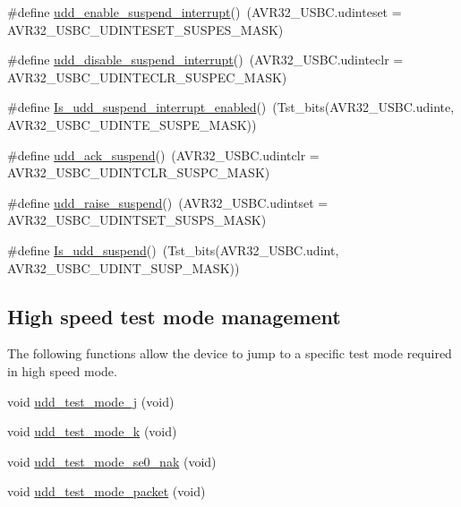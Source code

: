 \begin{DoxyCompactItemize}
\item 
\#define \hyperlink{group__udd__group_ga298cc43d16d7d9609d58adffe696b5db}{udd\-\_\-enable\-\_\-suspend\-\_\-interrupt}()~(\-A\-V\-R32\-\_\-\-U\-S\-B\-C.\-udinteset = \-A\-V\-R32\-\_\-\-U\-S\-B\-C\-\_\-\-U\-D\-I\-N\-T\-E\-S\-E\-T\-\_\-\-S\-U\-S\-P\-E\-S\-\_\-\-M\-A\-S\-K)
\item 
\#define \hyperlink{group__udd__group_ga1470fba0dbc68e890140d806277ee8c1}{udd\-\_\-disable\-\_\-suspend\-\_\-interrupt}()~(\-A\-V\-R32\-\_\-\-U\-S\-B\-C.\-udinteclr = \-A\-V\-R32\-\_\-\-U\-S\-B\-C\-\_\-\-U\-D\-I\-N\-T\-E\-C\-L\-R\-\_\-\-S\-U\-S\-P\-E\-C\-\_\-\-M\-A\-S\-K)
\item 
\#define \hyperlink{group__udd__group_ga2a9c882005f263ea9e181273bf316e27}{\-Is\-\_\-udd\-\_\-suspend\-\_\-interrupt\-\_\-enabled}()~(\-Tst\-\_\-bits(\-A\-V\-R32\-\_\-\-U\-S\-B\-C.\-udinte, \-A\-V\-R32\-\_\-\-U\-S\-B\-C\-\_\-\-U\-D\-I\-N\-T\-E\-\_\-\-S\-U\-S\-P\-E\-\_\-\-M\-A\-S\-K))
\item 
\#define \hyperlink{group__udd__group_ga9a61b0228571cf2c0225c86f3e3a618e}{udd\-\_\-ack\-\_\-suspend}()~(\-A\-V\-R32\-\_\-\-U\-S\-B\-C.\-udintclr = \-A\-V\-R32\-\_\-\-U\-S\-B\-C\-\_\-\-U\-D\-I\-N\-T\-C\-L\-R\-\_\-\-S\-U\-S\-P\-C\-\_\-\-M\-A\-S\-K)
\item 
\#define \hyperlink{group__udd__group_ga997d9f1f31efd62ddcce775a4f40a0bd}{udd\-\_\-raise\-\_\-suspend}()~(\-A\-V\-R32\-\_\-\-U\-S\-B\-C.\-udintset = \-A\-V\-R32\-\_\-\-U\-S\-B\-C\-\_\-\-U\-D\-I\-N\-T\-S\-E\-T\-\_\-\-S\-U\-S\-P\-S\-\_\-\-M\-A\-S\-K)
\item 
\#define \hyperlink{group__udd__group_gadfe9e8bbc2b3afefb19bcfd99db8b3fd}{\-Is\-\_\-udd\-\_\-suspend}()~(\-Tst\-\_\-bits(\-A\-V\-R32\-\_\-\-U\-S\-B\-C.\-udint, \-A\-V\-R32\-\_\-\-U\-S\-B\-C\-\_\-\-U\-D\-I\-N\-T\-\_\-\-S\-U\-S\-P\-\_\-\-M\-A\-S\-K))
\end{DoxyCompactItemize}
\subsection*{\-High speed test mode management}
\label{_amgrp2db3720a79ccf99f281dc8b84ab95b6b}%
 \-The following functions allow the device to jump to a specific test mode required in high speed mode. \begin{DoxyCompactItemize}
\item 
void \hyperlink{group__udd__group_ga43ba1e91e69f84c1481a659ff8eff143}{udd\-\_\-test\-\_\-mode\-\_\-j} (void)
\item 
void \hyperlink{group__udd__group_ga2acd547bcd2b470ee4e1ce34087926a8}{udd\-\_\-test\-\_\-mode\-\_\-k} (void)
\item 
void \hyperlink{group__udd__group_gabec7e8b6464e92ca9c8f32c59113bcbb}{udd\-\_\-test\-\_\-mode\-\_\-se0\-\_\-nak} (void)
\item 
void \hyperlink{group__udd__group_gab72f68f8d1a50f7e734595a2ff626380}{udd\-\_\-test\-\_\-mode\-\_\-packet} (void)
\end{DoxyCompactItemize}
